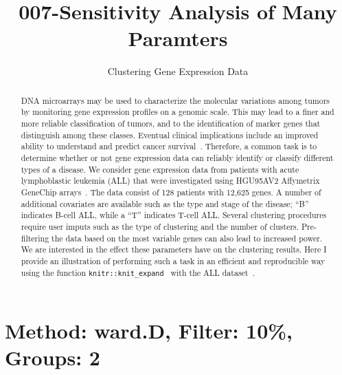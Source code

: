 \documentclass[11pt,letter]{article}\usepackage[]{graphicx}\usepackage[]{color}
\begin{document}
\pagestyle{fancy}

\title{007-Sensitivity Analysis of Many Paramters}
\author{Clustering Gene Expression Data}
\maketitle







\begin{abstract}
DNA microarrays may be used to characterize the molecular variations among tumors by monitoring gene expression profiles on a genomic scale. This may lead to a finer and more reliable classification of tumors, and to the identification of marker genes that distinguish among these classes. Eventual clinical implications include an improved ability to understand and predict cancer survival~\citep{cluster}. Therefore, a common task is to determine whether or not gene expression data can reliably identify or classify different types of a disease. We consider gene expression data from patients with acute lymphoblastic leukemia (ALL) that were investigated using HGU95AV2 Affymetrix GeneChip arrays~\citep{chiaretti2004gene}. The data consist of 128 patients with 12,625 genes. A number of additional covariates are available such as the type and stage of the disease; ``B'' indicates B-cell ALL, while a ``T'' indicates T-cell ALL. Several clustering procedures require user imputs such as the type of clustering and the number of clusters. Pre-filtering the data based on the most variable genes can also lead to increased power. We are interested in the effect these parameters have on the clustering results. Here I provide an illustration of performing such a task in an efficient and reproducible way using the function \texttt{knitr::knit\_expand}~\citep{k1,k2,k3} with the ALL dataset~\citep{all}.
\end{abstract}


\tableofcontents





\newpage
\section{Method: ward.D, Filter: 10\%, Groups: 2}
\end{document}
